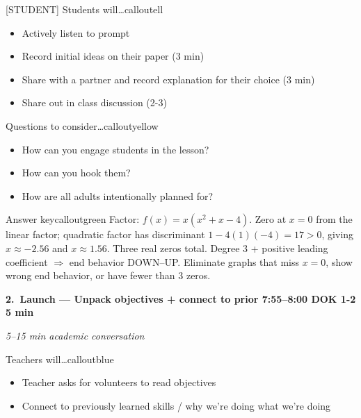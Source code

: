 \documentclass[10pt]{article}
\newcommand{\phasehead}[6]{%
  \vspace{0.25em}
  \noindent\colorbox{tealheader}{\parbox{\dimexpr\linewidth-2\fboxsep}{%
    \color{white}\bfseries #1.\ #2 \hfill \normalfont\bfseries #3 \textbullet{} DOK #4 \textbullet{} #5 min%
  }}\par
  {\small\itshape\color{framegray}#6}\par
  \smallskip
}
\begin{document}
\begin{callout}{[STUDENT] Students will\ldots}{calloutell}
\begin{itemize}[leftmargin=1.4em,itemsep=1pt,topsep=1pt]
  \item Actively listen to prompt
  \item Record initial ideas on their paper (3 min)
  \item Share with a partner and record explanation for their choice (3 min)
  \item Share out in class discussion (2-3)
\end{itemize}
\end{callout}

\begin{callout}{\IconPuzzle{} Questions to consider\ldots}{calloutyellow}
\begin{itemize}[leftmargin=1.4em,itemsep=1pt,topsep=1pt]
  \item How can you engage students in the lesson?
  \item How can you hook them?
  \item How are all adults intentionally planned for?
\end{itemize}
\end{callout}

\begin{callout}{\IconStar{} Answer key}{calloutgreen}
Factor: $f(x) = x(x^2 + x - 4)$. Zero at $x=0$ from the linear factor; quadratic factor has discriminant $1 - 4(1)(-4) = 17 > 0$, giving $x \approx -2.56$ and $x \approx 1.56$. Three real zeros total. Degree 3 + positive leading coefficient $\Rightarrow$ end behavior DOWN--UP. Eliminate graphs that miss $x=0$, show wrong end behavior, or have fewer than 3 zeros.
\end{callout}

\phasehead{2}{Launch --- Unpack objectives + connect to prior}{7:55--8:00}{1-2}{5}{5--15 min \textbullet{} academic conversation}

\begin{callout}{\IconSpeak{} Teachers will\ldots}{calloutblue}
\begin{itemize}[leftmargin=1.4em,itemsep=1pt,topsep=1pt]
  \item Teacher asks for volunteers to read objectives
  \item Connect to previously learned skills / why we're doing what we're doing
\end{itemize}
\end{callout}
\end{document}
